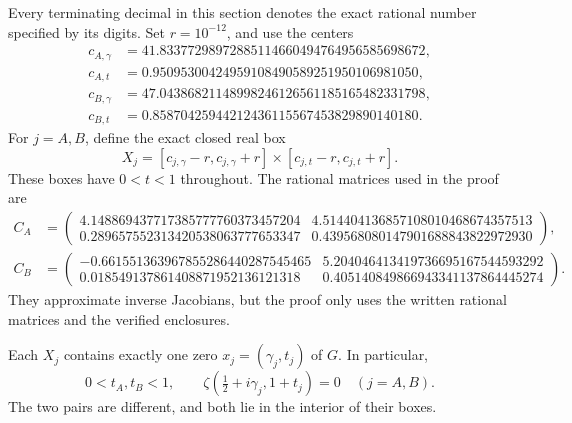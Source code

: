 Every terminating decimal in this section denotes the exact rational
number specified by its digits. Set \(r=10^{-12}\), and use the centers
\begin{align*}
 c_{A,\gamma}&=41.83377298972885114660494764956585698672,\\
 c_{A,t}&=0.95095300424959108490589251950106981050,\\
 c_{B,\gamma}&=47.04386821148998246126561185165482331798,\\
 c_{B,t}&=0.85870425944212436115567453829890140180.
\end{align*}
For \(j=A,B\), define the exact closed real box
\begin{equation}\label{hxc:boxes}
 X_j=[c_{j,\gamma}-r,c_{j,\gamma}+r]
          \times[c_{j,t}-r,c_{j,t}+r].
\end{equation}
These boxes have \(0<t<1\) throughout. The rational matrices used in
the proof are
\begin{align*}
 C_A&=\begin{pmatrix}
 4.148869437717385777760373457204&4.514404136857108010468674357513\\
 0.289657552313420538063777653347&0.439568080147901688843822972930
 \end{pmatrix},\\[3pt]
 C_B&=\begin{pmatrix}
 -0.661551363967855286440287545465&5.204046413419736695167544593292\\
 0.018549137861408871952136121318&0.405140849866943341137864445274
 \end{pmatrix}.
\end{align*}
They approximate inverse Jacobians, but the proof only uses the written
rational matrices and the verified enclosures.
\begin{hxctheorem}\label{hxc:certified}
Each \(X_j\) contains exactly one zero \(x_j=(\gamma_j,t_j)\) of
\(G\). In particular,
\[
 0<t_A,t_B<1,
 \qquad \zeta(\tfrac12+i\gamma_j,1+t_j)=0\quad(j=A,B).
\]
The two pairs are different, and both lie in the interior of their boxes.
\end{hxctheorem}

